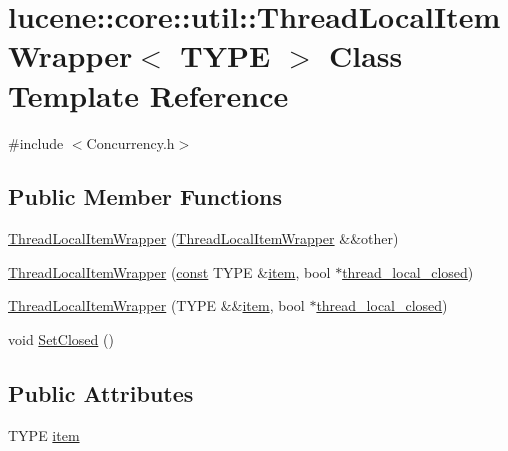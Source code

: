 \hypertarget{classlucene_1_1core_1_1util_1_1ThreadLocalItemWrapper}{}\section{lucene\+:\+:core\+:\+:util\+:\+:Thread\+Local\+Item\+Wrapper$<$ T\+Y\+PE $>$ Class Template Reference}
\label{classlucene_1_1core_1_1util_1_1ThreadLocalItemWrapper}


{\ttfamily \#include $<$Concurrency.\+h$>$}

\subsection*{Public Member Functions}
\begin{DoxyCompactItemize}
\item 
\mbox{\hyperlink{classlucene_1_1core_1_1util_1_1ThreadLocalItemWrapper_a22b175e5fd85c3d212bcf35962854add}{Thread\+Local\+Item\+Wrapper}} (\mbox{\hyperlink{classlucene_1_1core_1_1util_1_1ThreadLocalItemWrapper}{Thread\+Local\+Item\+Wrapper}} \&\&other)
\item 
\mbox{\hyperlink{classlucene_1_1core_1_1util_1_1ThreadLocalItemWrapper_aeb556f148918331e663767bf7522d9b6}{Thread\+Local\+Item\+Wrapper}} (\mbox{\hyperlink{ZlibCrc32_8h_a2c212835823e3c54a8ab6d95c652660e}{const}} T\+Y\+PE \&\mbox{\hyperlink{classlucene_1_1core_1_1util_1_1ThreadLocalItemWrapper_ac4814c461c9635ddb4f535f95e0d6cb8}{item}}, bool $\ast$\mbox{\hyperlink{classlucene_1_1core_1_1util_1_1ThreadLocalItemWrapper_a5e0fecb4397f3d5e19a03d07adde08b6}{thread\+\_\+local\+\_\+closed}})
\item 
\mbox{\hyperlink{classlucene_1_1core_1_1util_1_1ThreadLocalItemWrapper_af5f7a927aa01a94971cb9a358488d551}{Thread\+Local\+Item\+Wrapper}} (T\+Y\+PE \&\&\mbox{\hyperlink{classlucene_1_1core_1_1util_1_1ThreadLocalItemWrapper_ac4814c461c9635ddb4f535f95e0d6cb8}{item}}, bool $\ast$\mbox{\hyperlink{classlucene_1_1core_1_1util_1_1ThreadLocalItemWrapper_a5e0fecb4397f3d5e19a03d07adde08b6}{thread\+\_\+local\+\_\+closed}})
\item 
void \mbox{\hyperlink{classlucene_1_1core_1_1util_1_1ThreadLocalItemWrapper_a7ef4309330e9ca0eb7c0b99f19ff1948}{Set\+Closed}} ()
\end{DoxyCompactItemize}
\subsection*{Public Attributes}
\begin{DoxyCompactItemize}
\item 
T\+Y\+PE \mbox{\hyperlink{classlucene_1_1core_1_1util_1_1ThreadLocalItemWrapper_ac4814c461c9635ddb4f535f95e0d6cb8}{item}}
\end{DoxyCompactItemize}
